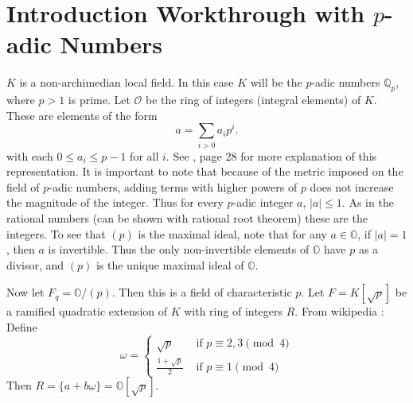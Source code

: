 \documentclass[11pt]{article}
\newcommand{\padic}{$p$-adic }
\begin{document}
\section{Introduction Workthrough with \padic Numbers}
$K$ is a non-archimedian local field. In this case $K$ will be the \padic numbers $\mathbb{Q}_p$, where $p > 1$ is prime.
Let 	$\mathcal{O}$ be the ring of integers (integral elements) of $K$. These are elements of the form
\[
a = \sum_{i > 0}a_i p^i.
\]
with each $0 \le a_i \le p - 1$ for all $i$. See \cite{katok}, page 28 for more explanation of this representation.
It is important to note that because of the metric imposed on the field of \padic numbers, adding terms with higher powers of $p$ does not increase the magnitude of the integer.
Thus for every \padic integer $a$, $|a| \le 1$.
As in the rational numbers (can be shown with rational root theorem) these are the integers.
To see that $(p)$ is the maximal ideal, note that for any $a \in \mathbb{O}$, if $|a| = 1$, then $a$ is invertible.
Thus the only non-invertible elements of $\mathbb{O}$ have $p$ as a divisor, and $(p)$ is the unique maximal ideal of $\mathbb{O}$.

Now let $F_q = \mathbb{O}/(p)$. Then this is a field of characteristic $p$.
Let $F = K[\sqrt{p}]$ be a ramified quadratic extension of $K$ with ring of integers $R$.
From wikipedia \cite{wikipedia:quadratic-integer}: Define
\[
\omega = \begin{cases}
\sqrt{p} &\text{ if } p \equiv 2,3 \pmod{4}\\
\frac{1 + \sqrt{p}}{2} &\text{ if } p \equiv 1 \pmod{4}
\end{cases}
\]
Then $R = \{a + b \omega \} = \mathbb{O}[\sqrt{p}]$.



\end{document}
